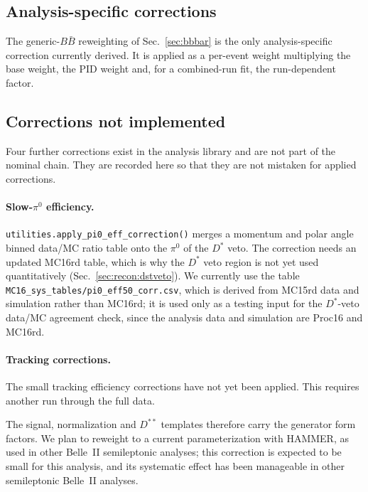 \subsection{Analysis-specific corrections}
\label{sec:corrections:specific}

The generic-$B\bar{B}$ reweighting of Sec.~\ref{sec:bbbar} is the only
analysis-specific correction currently derived.
It is applied as a per-event weight multiplying the base weight, the PID
weight and, for a combined-run fit, the run-dependent factor.


\subsection{Corrections not implemented}
\label{sec:corrections:notnominal}

Four further corrections exist in the analysis library and are not part of the
nominal chain.
They are recorded here so that they are not mistaken for applied corrections.

\paragraph{Slow-$\pi^{0}$ efficiency.}
\texttt{utilities.apply\_pi0\_eff\_correction()} merges a momentum and polar
angle binned data/MC ratio table onto the $\pi^{0}$ of the $D^{*}$ veto.
The correction needs an updated MC16rd table, which is why the $D^{*}$ veto
region is not yet used quantitatively (Sec.~\ref{sec:recon:dstveto}).
We currently use the table
\texttt{MC16\_sys\_tables/pi0\_eff50\_corr.csv}, which is derived from MC15rd data
and simulation rather than MC16rd; it is used only as a testing input for the
$D^{*}$-veto data/MC agreement check, since the analysis data and simulation
are Proc16 and MC16rd.

\paragraph{Tracking corrections.}
The small tracking efficiency corrections have not yet been applied. This requires
another run through the full data.
\vspace{2mm}

The signal, normalization and $D^{**}$ templates therefore carry the generator
form factors.  We plan to reweight to a current
parameterization with HAMMER, as used in other Belle~II semileptonic
analyses; this correction is expected to be small
for this analysis, and its systematic effect has been manageable in
other semileptonic Belle~II analyses.


